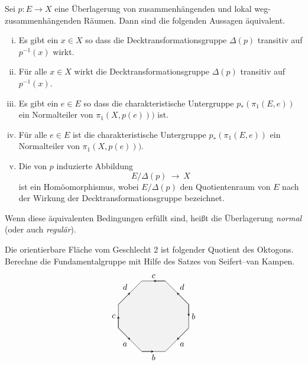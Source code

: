 \begin{aufgabe}
	Sei $p\colon E\to X$ eine Überlagerung von zusammenhängenden
	und lokal weg-zusammenhängenden Räumen.  Dann sind die folgenden Aussagen äquivalent.
	\begin{enumerate}[i)]
		\item Es gibt ein $x\in X$ so dass die Decktransformationsgruppe $\Delta(p)$
		transitiv auf $p^{-1}(x)$ wirkt.
		\item Für alle $x\in X$ wirkt die Decktransformationsgruppe $\Delta(p)$
		transitiv auf $p^{-1}(x)$.
		\item Es gibt ein $e\in E$ so dass die charakteristische Untergruppe
		$p_*(\pi_1(E,e))$ ein Normalteiler von $\pi_1(X,p(e)))$ ist.
		\item Für alle $e\in E$ ist die charakteristische Untergruppe
		$p_*(\pi_1(E,e))$ ein Normalteiler von $\pi_1(X,p(e)))$.
		\item Die von $p$ induzierte Abbildung
		\[ E/\Delta(p) \ \to \  X\]
		ist ein Homöomorphismus, wobei $E/\Delta(p)$ den
		Quotientenraum von $E$ nach der Wirkung der Decktransformationsgruppe
		bezeichnet.
	\end{enumerate}	
	Wenn diese äquivalenten Bedingungen erfüllt sind, heißt
	die Überlagerung \emph{normal} (oder auch \emph{regulär}).
\end{aufgabe}

\begin{aufgabe}
	Die orientierbare Fläche vom Geschlecht 2 ist folgender Quotient des Oktogons. Berechne die Fundamentalgruppe mit Hilfe des Satzes von Seifert--van Kampen. %
	\[	\begin{tikzpicture}[auto, glueing/.style= {->, >=stealth}, scale = 1]
		\fill[color = gray!10] (0,1)--(1,0)--(2,0)--(3,1)--(3,2)--(2,3)--(1,3)--(0,2)--(0,1);
		\draw (0,1) to node[swap]{$a$} (1,0);\draw[glueing] (0,1) to (0.5,0.5);
		\draw (3,1) to node{$a$} (2,0);\draw[glueing] (3,1) to (2.5,0.5);
		\draw (1,0) to node[swap]{$b$} (2,0);\draw[glueing] (1,0) to (1.5,0);
		\draw (3,2) to node{$b$} (3,1);\draw[glueing] (3,2) to (3,1.5);
		\draw (0,1) to node{$c$} (0,2);\draw[glueing] (0,1) to (0,1.5);
		\draw (3,2) to node[swap]{$d$} (2,3);\draw[glueing] (3,2) to (2.5,2.5);
		\draw (0,2) to node{$d$} (1,3);\draw[glueing] (0,2) to (0.5,2.5);
		\draw (2,3) to node[swap]{$c$} (1,3);\draw[glueing] (2,3) to (1.5,3);
	\end{tikzpicture}\]
\end{aufgabe}

